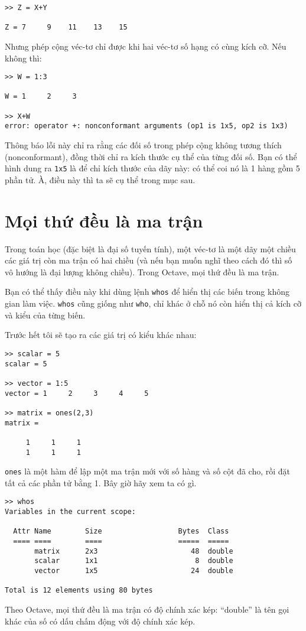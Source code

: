 \documentclass[12pt]{book}
\begin{document}
\begin{verbatim}
>> Z = X+Y

Z = 7     9    11    13    15
\end{verbatim}
%
Nhưng phép cộng véc-tơ chỉ được khi hai véc-tơ số hạng có cùng
kích cỡ. Nếu không thì:

\begin{verbatim}
>> W = 1:3

W = 1     2     3

>> X+W
error: operator +: nonconformant arguments (op1 is 1x5, op2 is 1x3)
\end{verbatim}
%
Thông báo lỗi này chỉ ra rằng các đối số trong phép cộng không tương thích
(nonconformant), đồng thời chỉ ra kích thước cụ thể của từng đối số. Bạn có
thể hình dung ra \texttt{1x5} là để chỉ kích thước của dãy này: có thể coi nó
là 1 hàng gồm 5 phần tử. À, điều này thì ta sẽ cụ thể trong mục sau.


\section{Mọi thứ đều là ma trận}

Trong toán học (đặc biệt là đại số tuyến tính), một véc-tơ là một dãy
một chiều các giá trị còn ma trận có hai chiều (và nếu bạn muốn
nghĩ theo cách đó thì số vô hướng là đại lượng không chiều). 
Trong Octave, mọi thứ đều là ma trận.

Bạn có thể thấy điều này khi dùng lệnh {\tt whos} để hiển thị các
biến trong không gian làm việc.  {\tt whos} cũng giống như 
{\tt who}, chỉ khác ở chỗ nó còn hiển thị cả kích cỡ và kiểu của
từng biến.

Trước hết tôi sẽ tạo ra các giá trị có kiểu khác nhau:

\begin{verbatim}
>> scalar = 5
scalar = 5

>> vector = 1:5
vector = 1     2     3     4     5

>> matrix = ones(2,3)
matrix =

     1     1     1
     1     1     1
\end{verbatim}
%
{\tt ones} là một hàm để lập một ma trận mới với số hàng và
số cột đã cho, rồi đặt tất cả các phần tử bằng 1. Bây giờ hãy
xem ta có gì.

\begin{verbatim}
>> whos
Variables in the current scope:

  Attr Name        Size                  Bytes  Class
  ==== ====        ====                  =====  ===== 
       matrix      2x3                      48  double
       scalar      1x1                       8  double
       vector      1x5                      24  double

Total is 12 elements using 80 bytes
\end{verbatim}
%
Theo Octave, mọi thứ đều là ma trận có độ chính xác kép:  
``double'' là tên gọi khác của số có dấu chấm động với 
độ chính xác kép.
\end{document}
